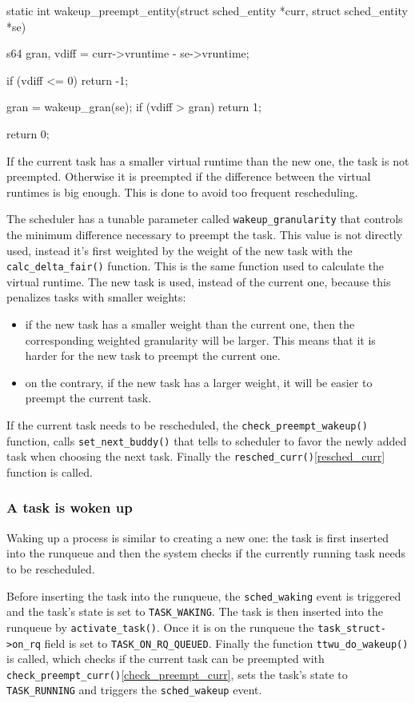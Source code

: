 \begin{code}
static int
wakeup_preempt_entity(struct sched_entity *curr, struct sched_entity *se)
{
	s64 gran, vdiff = curr->vruntime - se->vruntime;

	if (vdiff <= 0)
		return -1;

	gran = wakeup_gran(se);
	if (vdiff > gran)
		return 1;

	return 0;
}
\end{code}

If the current task has a smaller virtual runtime than the new one, the task is not preempted. Otherwise it is preempted if the difference between the virtual runtimes is big enough. This is done to avoid too frequent rescheduling. 

The scheduler has a tunable parameter called \verb|wakeup_granularity| that controls the minimum difference necessary to preempt the task. This value is not directly used, instead it's first weighted by the weight of the new task with the \verb|calc_delta_fair()| function.  This is the same function used to calculate the virtual runtime. The new task is used, instead of the current one, because this penalizes tasks with smaller weights:
\begin{itemize}
    \item if the new task has a smaller weight than the current one, then the corresponding weighted granularity will be larger. This means that it is harder for the new task to preempt the current one.
    
    \item on the contrary, if the new task has a larger weight, it will be easier to preempt the current task. 
\end{itemize}

If the current task needs to be rescheduled, the \verb|check_preempt_wakeup()| function, calls \verb|set_next_buddy()| that tells to scheduler to favor the newly added task when choosing the next task. Finally the \verb|resched_curr()|\ref{resched_curr} function is called.

\subsubsection{A task is woken up}

Waking up a process is similar to creating a new one: the task is first inserted into the runqueue and then the system checks if the currently running task needs to be rescheduled.

Before inserting the task into the runqueue, the \verb|sched_waking|\label{trace:sched_waking} event is triggered and the task's state is set to \verb|TASK_WAKING|. The task is then inserted into the runqueue by \verb|activate_task()|. Once it is on the runqueue the \verb|task_struct->on_rq| field  is set to \verb|TASK_ON_RQ_QUEUED|. Finally the function \verb|ttwu_do_wakeup()| is called, which checks if the current task can be preempted with \verb|check_preempt_curr()|\ref{check_preempt_curr}, sets the task's state to \verb|TASK_RUNNING| and triggers the \verb|sched_wakeup|\label{trace:sched_wakeup} event.

